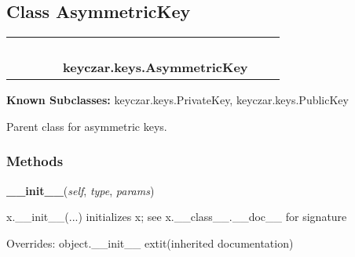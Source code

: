 \subsection{Class AsymmetricKey}

    \label{keyczar:keys:AsymmetricKey}
\begin{tabular}{cccccccc}
\multicolumn{2}{r}{\settowidth{\BCL}{object}\multirow{2}{\BCL}{object}}
&&
&&
  \\\cline{3-3}
  &&\multicolumn{1}{c|}{}
&&
&&
  \\
\multicolumn{4}{r}{\settowidth{\BCL}{keyczar.keys.Key}\multirow{2}{\BCL}{keyczar.keys.Key}}
&&
  \\\cline{5-5}
  &&&&\multicolumn{1}{c|}{}
&&
  \\
&&&&\multicolumn{2}{l}{\textbf{keyczar.keys.AsymmetricKey}}
\end{tabular}

\textbf{Known Subclasses:}
keyczar.keys.PrivateKey,
    keyczar.keys.PublicKey

Parent class for asymmetric keys.



  \subsubsection{Methods}

    \vspace{0.5ex}

\hspace{.8\funcindent}\begin{boxedminipage}{\funcwidth}

    \raggedright \textbf{\_\_init\_\_}(\textit{self}, \textit{type}, \textit{params})

\setlength{\parskip}{2ex}
    x.\_\_init\_\_(...) initializes x; see x.\_\_class\_\_.\_\_doc\_\_ for 
    signature

\setlength{\parskip}{1ex}
      Overrides: object.\_\_init\_\_ 	extit{(inherited documentation)}

    \end{boxedminipage}


